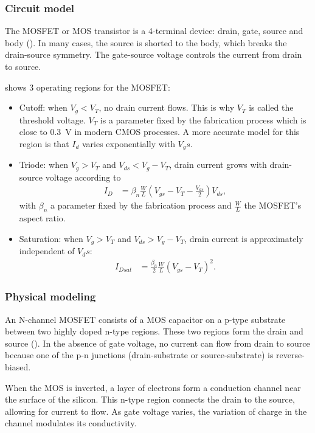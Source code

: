\subsubsection{Circuit model}
\label{section:ecuaciones_mos}
The MOSFET or MOS transistor is a 4-terminal device:
drain, gate, source and body ().
In many cases, the source is shorted to the body,
which breaks the drain-source symmetry.
The gate-source voltage controls the current from drain to source.

 shows 3 operating regions for the MOSFET:
\begin{itemize}
    \item Cutoff: when $V_g<V_T$, no drain current flows.
        This is why $V_T$ is called the threshold voltage.
        $V_T$ is a parameter fixed by the fabrication process
        which is close to \SI{.3}{\volt} in modern CMOS processes.
        A more accurate model for this region is that $I_d$ varies
        exponentially with $V_gs$.
    \item Triode: when $V_g>V_T$ and $V_{ds}<V_g-V_T$, 
        drain current grows with drain-source voltage according to
        \begin{align*}
            I_D&=\beta_n\frac WL(V_{gs}-V_T-\frac{V_{ds}}2)V_{ds},
        \end{align*}
        with $\beta_n$ a parameter fixed by the fabrication process
        and $\frac WL$ the MOSFET's aspect ratio.
    \item Saturation: when $V_g>V_T$ and $V_{ds}>V_g-V_T$,
        drain current is approximately independent of $V_ds$:
        \begin{align*}
            I_{Dsat}&=\frac{\beta_n}2\frac WL(V_{gs}-V_T)^2.
        \end{align*}
\end{itemize}
%
\subsubsection{Physical modeling}
An N-channel MOSFET consists of a MOS capacitor on a p-type substrate
between two highly doped n-type regions.
These two regions form the drain and source ().
In the absence of gate voltage,
no current can flow from drain to source because 
one of the p-n junctions (drain-substrate or source-substrate) is reverse-biased.

When the MOS is inverted,
a layer of electrons form a conduction channel near the surface of the silicon.
This n-type region connects the drain to the source, allowing for current to flow.
As gate voltage varies,
the variation of charge in the channel modulates its conductivity.
